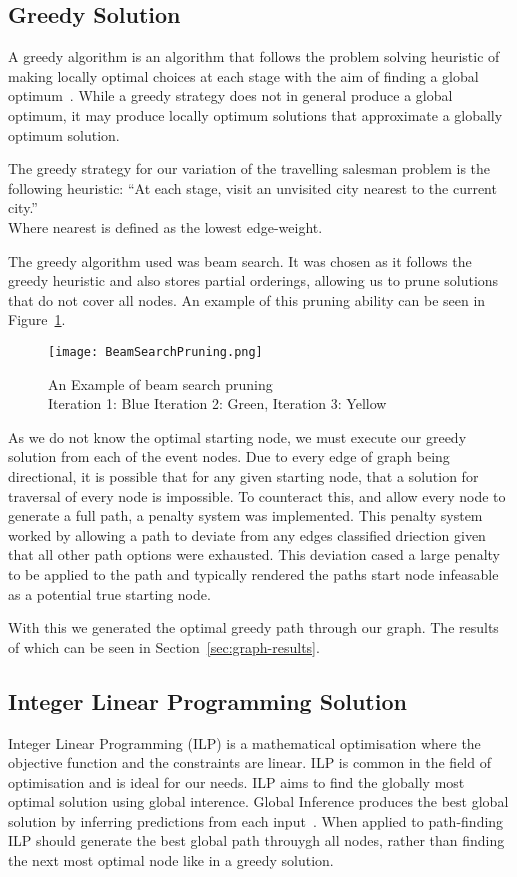 \documentclass[bsc,frontabs,twoside,singlespacing,parskip,deptreport]{infthesis}     %
\begin{document}
\subsection{Greedy Solution}
A greedy algorithm is an algorithm that follows the problem solving heuristic of making locally optimal choices at each stage with the aim
of finding a global optimum~\cite{black2004dictionary}.
While a greedy strategy does not in general produce a global optimum, it may produce locally optimum solutions that approximate a globally optimum solution.


The greedy strategy for our variation of the travelling salesman problem is the following heuristic:
``At each stage, visit an unvisited city nearest to the current city.''\\
Where nearest is defined as the lowest edge-weight.


The greedy algorithm used was beam search.
It was chosen as it follows the greedy heuristic and also stores partial orderings,
allowing us to prune solutions that do not cover all nodes.
An example of this pruning ability can be seen in Figure~\ref{fig:beam-prune}.

\begin{figure}
  \centering
  \texttt{[image: BeamSearchPruning.png]}
  \caption{An Example of beam search pruning\\ Iteration 1: Blue Iteration 2: Green, Iteration 3: Yellow}
  \label{fig:beam-prune}
\end{figure}

As we do not know the optimal starting node, we must execute our greedy solution from each of the event nodes.
Due to every edge of graph being directional, it is possible that for any given starting node, that a solution for traversal
of every node is impossible. To counteract this, and allow every node to generate a full path, a penalty system was implemented.
This penalty system worked by allowing a path to deviate from any edges classified driection given that all other path options
were exhausted. This deviation cased a large penalty to be applied to the path and typically rendered the paths start node
infeasable as a potential true starting node. 

With this we generated the optimal greedy path through our graph. The results of which can be seen in Section~\ref{sec:graph-results}.

\subsection{Integer Linear Programming Solution}
Integer Linear Programming (ILP) is a mathematical optimisation where the objective function and the constraints are linear.
ILP is common in the field of optimisation and is ideal for our needs. ILP aims to find the globally most optimal solution using global interence.
Global Inference produces the best global solution by inferring predictions from each input~\cite{roth2004linear}.%
When applied to path-finding ILP should generate the best global path throuygh all nodes, rather than finding the next most optimal node like in a greedy solution.
\end{document}
